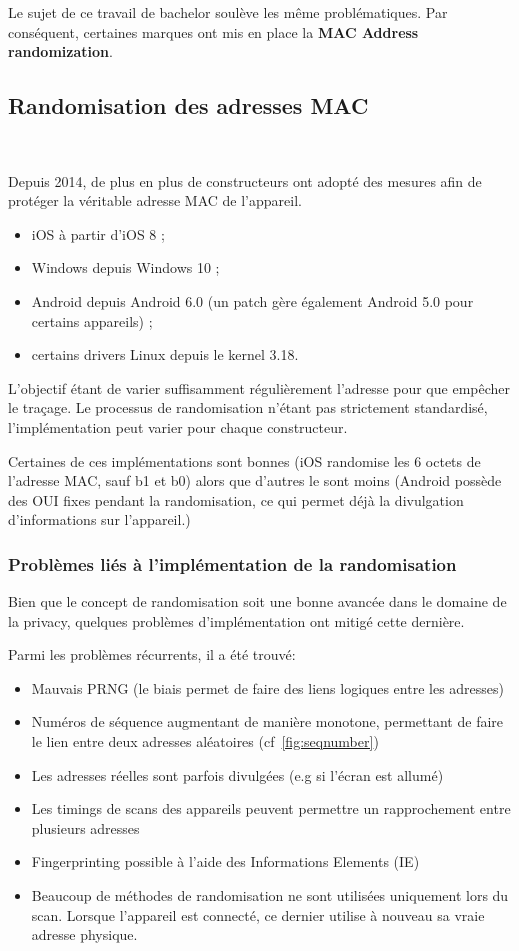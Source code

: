 Le sujet de ce travail de bachelor soulève les même problématiques. Par conséquent, certaines marques
ont mis en place la \textbf{MAC Address randomization}.

\subsection{Randomisation des adresses MAC}~\cite{connected:macrandom}

Depuis 2014, de plus en plus de constructeurs ont adopté des mesures
afin de protéger la véritable adresse MAC de l'appareil. 

\begin{itemize}
    \item iOS à partir d’iOS 8 ;
    \item Windows depuis Windows 10 ;
    \item Android depuis Android 6.0 (un patch gère également Android 5.0 pour certains appareils) ;
    \item certains drivers Linux depuis le kernel 3.18.
\end{itemize}

L'objectif étant de varier suffisamment régulièrement l'adresse pour que empêcher le traçage. 
Le processus de randomisation n'étant pas strictement standardisé, l'implémentation peut varier pour chaque constructeur. 

Certaines de ces implémentations sont bonnes (iOS randomise les 6 octets de l'adresse MAC, sauf b1 et b0) alors que d'autres le sont moins (Android possède des OUI fixes pendant la randomisation, ce qui 
permet déjà la divulgation d'informations sur l'appareil.)

\subsubsection{Problèmes liés à l'implémentation de la randomisation}

Bien que le concept de randomisation soit une bonne avancée dans le domaine de la privacy, quelques
problèmes d'implémentation ont mitigé cette dernière. 

Parmi les problèmes récurrents, il a été trouvé:
\begin{itemize}
	\item Mauvais PRNG (le biais permet de faire des liens logiques entre les adresses)
	\item Numéros de séquence augmentant de manière monotone, permettant de faire le lien entre deux adresses aléatoires (cf~\ref{fig:seqnumber})
	\item Les adresses réelles sont parfois divulgées (e.g si l'écran est allumé)
	\item Les timings de scans des appareils peuvent permettre un rapprochement entre plusieurs adresses
	\item Fingerprinting possible à l'aide des Informations Elements (IE)
	\item Beaucoup de méthodes de randomisation ne sont utilisées uniquement lors du scan. Lorsque l'appareil est connecté, ce dernier utilise à nouveau
	sa vraie adresse physique.
\end{itemize} 

